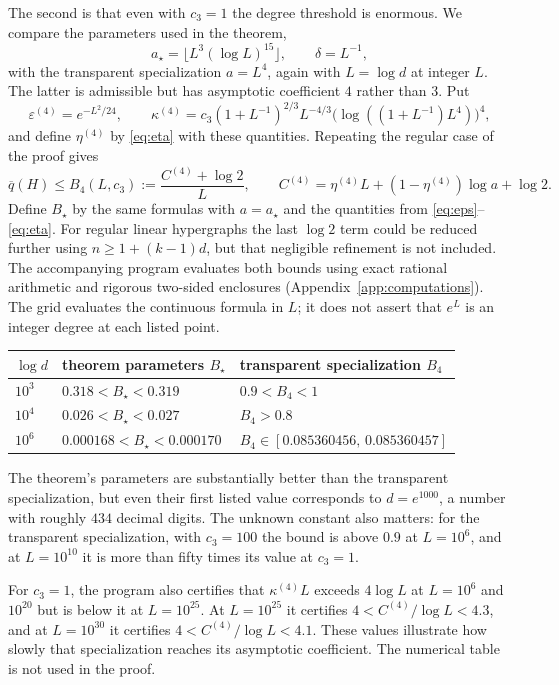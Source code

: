 \documentclass[11pt,a4paper]{amsart}
\theoremstyle{plain}
\theoremstyle{definition}
\theoremstyle{remark}
\newcommand{\qbar}{\overline{q}}
\begin{document}
The second is that even with $c_3=1$ the degree threshold is enormous. We compare the
parameters used in the theorem,
\[
  a_\star=\bigl\lfloor L^3(\log L)^{15}\bigr\rfloor,
  \qquad \delta=L^{-1},
\]
with the transparent specialization $a=L^4$, again with $L=\log d$ at integer $L$.
The latter is admissible but has asymptotic coefficient $4$ rather than $3$. Put
\[
  \varepsilon^{(4)}=e^{-L^2/24},\qquad
  \kappa^{(4)}=c_3(1+L^{-1})^{2/3}L^{-4/3}
    \bigl(\log((1+L^{-1})L^4)\bigr)^4,
\]
and define $\eta^{(4)}$ by \eqref{eq:eta} with these quantities. Repeating the regular
case of the proof gives
\[
  \qbar(H)\le B_4(L,c_3):=\frac{C^{(4)}+\log2}{L},\qquad
  C^{(4)}=\eta^{(4)}L+(1-\eta^{(4)})\log a+\log2.
\]
Define $B_\star$ by the same formulas with $a=a_\star$ and the quantities from
\eqref{eq:eps}--\eqref{eq:eta}. For regular linear hypergraphs the last $\log2$ term
could be reduced further using $n\ge1+(k-1)d$, but that negligible refinement is not
included. The accompanying program evaluates both bounds using exact rational arithmetic
and rigorous two-sided enclosures (Appendix~\ref{app:computations}).
The grid evaluates the continuous formula in $L$; it does not assert that $e^L$ is an
integer degree at each listed point.

\begin{center}
\begin{tabular}{lll}
\hline
$\log d$ & theorem parameters $B_\star$ & transparent specialization $B_4$\\
\hline
$10^{3}$ & $0.318<B_\star<0.319$ & $0.9<B_4<1$\\
$10^{4}$ & $0.026<B_\star<0.027$ & $B_4>0.8$\\
$10^{6}$ & $0.000168<B_\star<0.000170$ &
  $B_4\in[0.085360456,\,0.085360457]$\\
\hline
\end{tabular}
\end{center}

\noindent
The theorem's parameters are substantially better than the transparent specialization,
but even their first listed value corresponds to $d=e^{1000}$, a number with roughly
$434$ decimal digits. The unknown constant also matters: for the transparent
specialization, with $c_3=100$ the bound is above $0.9$ at $L=10^6$, and at
$L=10^{10}$ it is more than fifty times its value at $c_3=1$.

For $c_3=1$, the program also certifies that $\kappa^{(4)}L$ exceeds $4\log L$ at
$L=10^6$ and $10^{20}$ but is below it at $L=10^{25}$. At $L=10^{25}$ it certifies
$4<C^{(4)}/\log L<4.3$, and at $L=10^{30}$ it certifies
$4<C^{(4)}/\log L<4.1$. These values illustrate how slowly that specialization reaches
its asymptotic coefficient. The numerical table is not used in the proof.
\end{document}

